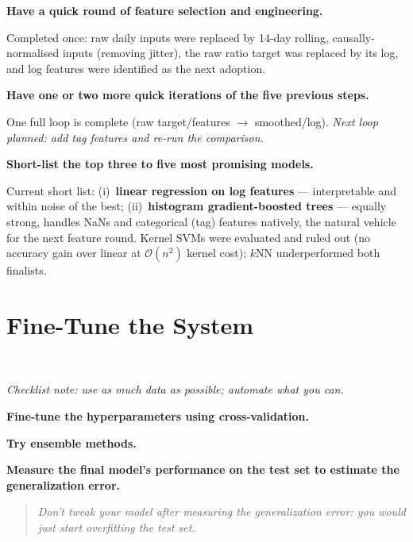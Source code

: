 \documentclass[11pt,a4paper]{article}
\newcommand{\StatusBadge}[2]{\colorbox{#1}{\textcolor{white}{\sffamily\bfseries\footnotesize\;#2\;}}}
\newcommand{\SectionStatus}[2]{\noindent\StatusBadge{#1}{#2}\par\medskip}
\newcommand{\chk}[1]{\item \textbf{#1}\par\nopagebreak\vspace{0.15em}}
\newcommand{\pending}[1][Not yet addressed.]{\textcolor{sttodo}{\itshape #1}}
\newcommand{\blankanswer}{\vspace{2.8em}}   %
\newcommand{\guidance}[1]{\textcolor{soft}{\small\itshape Checklist note: #1}\par\medskip}
\begin{document}
\begin{checklist}
\chk{Have a quick round of feature selection and engineering.}
Completed once: raw daily inputs were replaced by 14-day rolling,
causally-normalised inputs (removing jitter), the raw ratio target was
replaced by its log, and log features were identified as the next
adoption.

\chk{Have one or two more quick iterations of the five previous steps.}
One full loop is complete (raw target/features $\rightarrow$
smoothed/log). \pending[Next loop planned: add tag features and re-run the
comparison.]

\chk{Short-list the top three to five most promising models.}
Current short list: (i)~\textbf{linear regression on log features} ---
interpretable and within noise of the best; (ii)~\textbf{histogram
gradient-boosted trees} --- equally strong, handles NaNs and categorical
(tag) features natively, the natural vehicle for the next feature round.
Kernel SVMs were evaluated and ruled out (no accuracy gain over linear at
$\mathcal{O}(n^2)$ kernel cost); $k$NN underperformed both finalists.

\end{checklist}

\section{Fine-Tune the System}
\SectionStatus{sttodo}{NOT STARTED}
\guidance{use as much data as possible; automate what you can.}

\begin{checklist}

\chk{Fine-tune the hyperparameters using cross-validation.}
\blankanswer

\chk{Try ensemble methods.}
\blankanswer

\chk{Measure the final model's performance on the test set to estimate the generalization error.}
\blankanswer

\end{checklist}

\begin{quote}\itshape\color{soft}
Don't tweak your model after measuring the generalization error: you would
just start overfitting the test set.
\end{quote}
\end{document}

